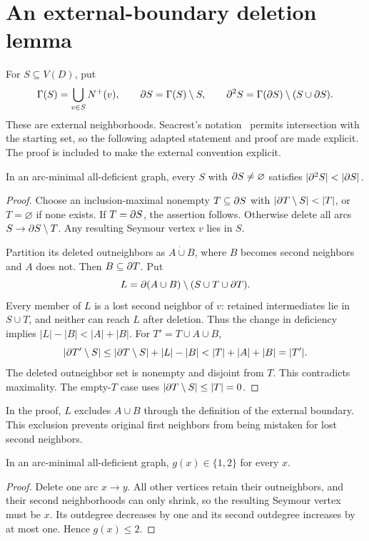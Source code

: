 \section{An external-boundary deletion lemma}

For $S\subseteq V(D)$, put
\[
\Gamma(S)=\bigcup_{v\in S}N^+(v),\qquad
\partial S=\Gamma(S)\setminus S,\qquad
\partial^2S=\Gamma(\partial S)\setminus(S\cup\partial S).
\]
These are external neighborhoods. Seacrest's notation~\cite{SeacrestSubsets2019} permits
intersection with the starting set, so the following adapted statement
and proof are made explicit. The proof is included to make the external convention explicit.

\begin{lemma}\label{lem:boundary}
In an arc-minimal all-deficient graph, every $S$ with $\partial S\ne\varnothing$
satisfies $|\bd^2S|<|\bd S|$.
\end{lemma}
\begin{proof}
Choose an inclusion-maximal nonempty $T\subseteq\partial S$ with
$|\bd T\setminus S|<|T|$, or $T=\varnothing$ if none exists.
If $T=\partial S$, the assertion follows. Otherwise delete all arcs
$S\to\partial S\setminus T$. Any resulting Seymour vertex $v$ lies in $S$.

Partition its deleted outneighbors as $A\dot\cup B$, where $B$ becomes
second neighbors and $A$ does not. Then $B\subseteq\partial T$. Put
\[
L=\partial(A\cup B)\setminus(S\cup T\cup\partial T).
\]
Every member of $L$ is a lost second neighbor of $v$: retained
intermediates lie in $S\cup T$, and neither can reach $L$ after deletion.
Thus the change in deficiency implies
$|L|-|B|<|A|+|B|$.
For $T'=T\cup A\cup B$,
\[
|\bd T'\setminus S|
 \le|\bd T\setminus S|+|L|-|B|
 <|T|+|A|+|B|=|T'|.
\]
The deleted outneighbor set is nonempty and disjoint from $T$.
This contradicts maximality. The empty-$T$ case uses
$|\partial T\setminus S|\le |T|=0$.
\end{proof}

In the proof, $L$ excludes $A\cup B$ through the definition of the
external boundary. This exclusion prevents original first neighbors
from being mistaken for lost second neighbors.

\begin{lemma}\label{lem:gap}
In an arc-minimal all-deficient graph, $g(x)\in\{1,2\}$ for every $x$.
\end{lemma}
\begin{proof}
Delete one arc $x\to y$. All other vertices retain their outneighbors,
and their second neighborhoods can only shrink, so the resulting
Seymour vertex must be $x$. Its outdegree decreases by one and its second
outdegree increases by at most one. Hence $g(x)\le2$.
\end{proof}

